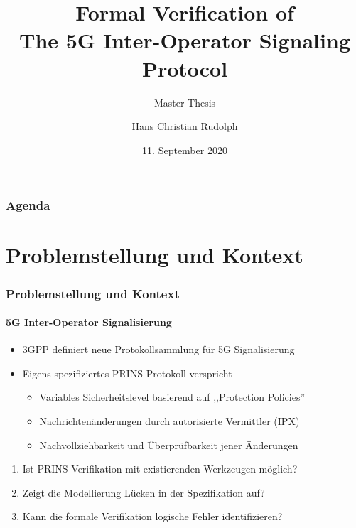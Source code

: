 \documentclass{beamer}
\title{Formal Verification of\\ The 5G Inter-Operator Signaling Protocol}
\subtitle{Master Thesis}
\author{Hans Christian Rudolph}
\institute{Hochschule Wismar}
\date{11. September 2020}
\begin{document}
\frame{\titlepage}

\begin{frame}
    \frametitle{Agenda}
    \tableofcontents
\end{frame}

\section{Problemstellung und Kontext}

\begin{frame}
    \frametitle{Problemstellung und Kontext}
    \framesubtitle{5G Inter-Operator Signalisierung}

    \begin{itemize}
        \item<1-> 3GPP definiert neue Protokollsammlung für 5G Signalisierung
        \vspace*{2mm}
        \item<2-> Eigens spezifiziertes PRINS Protokoll verspricht
        \begin{itemize}
            \item<2-> Variables Sicherheitslevel basierend auf ,,Protection Policies''
            \item<2-> Nachrichtenänderungen durch autorisierte Vermittler (IPX)
            \item<2-> Nachvollziehbarkeit und Überprüfbarkeit jener Änderungen
        \end{itemize}
    \end{itemize}
    \vspace*{3mm}
    \begin{enumerate}
        \item<3-> Ist PRINS Verifikation mit existierenden Werkzeugen möglich?
        \item<4-> Zeigt die Modellierung Lücken in der Spezifikation auf?
        \item<5-> Kann die formale Verifikation logische Fehler identifizieren?
    \end{enumerate}
\end{frame}
\end{document}

